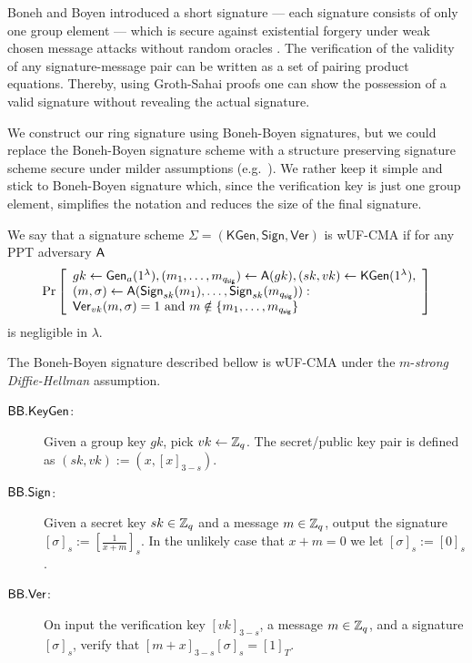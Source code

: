 

Boneh and Boyen introduced a short signature --- each signature consists of only one group element --- which is secure against existential forgery under weak chosen message attacks without random oracles \cite{EC:BonBoy04a}.
The verification of the validity of any signature-message pair can be written as a set of pairing product equations. Thereby, using Groth-Sahai proofs one can show the possession of a valid signature without revealing the actual signature.

We construct our ring signature using Boneh-Boyen signatures, but we could replace the Boneh-Boyen signature scheme with a structure preserving signature scheme secure under milder assumptions (e.g.~\cite{EPRINT:JutRoy17}). We rather keep it simple and stick to Boneh-Boyen signature which, since the verification key is just one group element, simplifies the notation and reduces the size of the final signature.
 
\begin{definition} We say that a signature scheme $\Sigma = (\mathsf{KGen},\mathsf{Sign},\mathsf{Ver})$ is wUF-CMA if for any PPT adversary $\mathsf{A}$
	$$
	\Pr\left[\begin{array}{l}
	gk \gets \mathsf{Gen}_a(1^\lambda), (m_1,\ldots,m_{q_\mathsf{sig}})\gets\mathsf{A}(gk), (sk,vk)\gets\mathsf{KGen}(1^\lambda), \\
	(m,\sigma)\gets\mathsf{A}(\mathsf{Sign}_{sk}(m_1),\ldots,\mathsf{Sign}_{sk}(m_{q_\mathsf{sig}})):\\
	\mathsf{Ver}_{vk}(m,\sigma)=1 \text{ and } m\notin \{m_1,\ldots,m_{q_\mathsf{sig}}\}
	\end{array}\right]
	$$
is negligible in $\lambda$.
\end{definition}

The Boneh-Boyen signature described bellow is wUF-CMA under the $m$-\emph{strong Diffie-Hellman} assumption.
%
%

\begin{description}
\item[$\mathsf{BB}.\mathsf{KeyGen}$:] Given a group key $gk$, pick $vk\gets\mathbb{Z}_q$. The secret/public key pair is defined as $(sk,vk):=(x,[x]_{3-s})$.
\item[$\mathsf{BB}.\mathsf{Sign}$:] Given a secret key $sk\in\mathbb{Z}_q$ and a message $m\in\mathbb{Z}_q$, output the signature $[\sigma]_{s}:=\left[\frac{1}{x+m}\right]_{s}$. In the unlikely case that $x+m=0$ we let $[\sigma]_{s}:=[0]_{s}$.
\item[$\mathsf{BB}.\mathsf{Ver}$:] On input the verification key $[vk]_{3-s}$, a message $m\in\mathbb{Z}_q$, and a signature $[\sigma]_{s}$, verify that $[m+x]_{3-s}[\sigma]_{s}=[1]_T$.
\end{description} 

